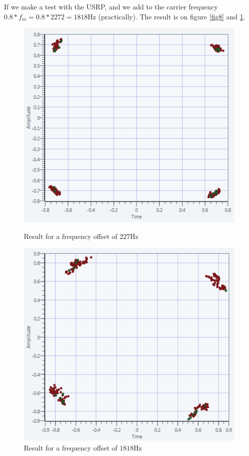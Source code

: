 \documentclass[frenchb, oneside, headings=normal]{scrartcl}
\begin{document}
If we make a test with the USRP, and we add to the carrier frequency $0.8*f_m=0.8*2272=1818 \si{\hertz}$ (practically). The result is on figure \ref{fig8} and \ref{fig9}.

\begin{figure}[!ht]
  \begin{minipage}[b]{0.48\linewidth}
        \centering \includegraphics[scale=0.7]{img/USRP_carrieroffset_227.PNG}
    \caption{Result for a frequency offset of $227 \si{\hertz}$}
    \label{fig8}
    \end{minipage}\hfill
    \begin{minipage}[b]{0.48\linewidth}
         \centering \includegraphics[scale=0.7]{img/USRP_carrieroffset_1818.PNG}
          \caption{Result for a frequency offset of $1818 \si{\hertz}$}
          \label{fig9}
    \end{minipage}
\end{figure}
\end{document}
